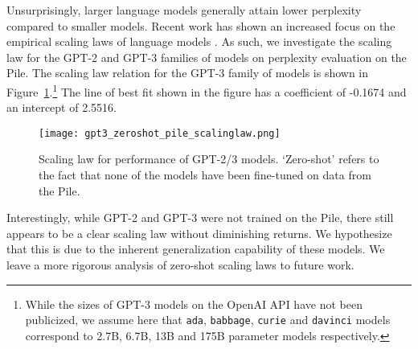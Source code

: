 \documentclass[11pt,a4paper]{article}
\begin{document}
Unsurprisingly, larger language models generally attain lower perplexity compared to smaller models. Recent work has shown an increased focus on the empirical scaling laws of language models \citep{scaling-nlms, scaling-autoregressive}. As such, we investigate the scaling law for the GPT-2 and GPT-3 families of models on perplexity evaluation on the Pile. The scaling law relation for the GPT-3 family of models is shown in Figure~\ref{fig:scaling_law_gpt3}.\footnote{While the sizes of GPT-3 models on the OpenAI API have not been publicized, we assume here that \texttt{ada}, \texttt{babbage}, \texttt{curie} and \texttt{davinci} models correspond to 2.7B, 6.7B, 13B and 175B parameter models respectively.} The line of best fit shown in the figure has a coefficient of -0.1674 and an intercept of 2.5516.


\begin{figure}[ht]
  \texttt{[image: gpt3\_zeroshot\_pile\_scalinglaw.png]}
  \caption{Scaling law for performance of GPT-2/3 models. `Zero-shot' refers to the fact that none of the models have been fine-tuned on data from the Pile.}
  \label{fig:scaling_law_gpt3}
\end{figure}

Interestingly, while GPT-2 and GPT-3 were not trained on the Pile, there still appears to be a clear scaling law without diminishing returns. We hypothesize that this is due to the inherent generalization capability of these models. We leave a more rigorous analysis of zero-shot scaling laws to future work. 
\end{document}
